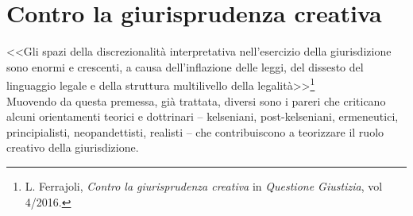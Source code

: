 \section{Contro la giurisprudenza creativa}%
<<Gli spazi della discrezionalità interpretativa nell’esercizio della giurisdizione sono enormi e crescenti, a causa dell’inflazione delle leggi, del dissesto del linguaggio legale e della struttura multilivello della legalità>>\footnote{L. Ferrajoli, \textit{Contro la giurisprudenza creativa} in \textit{Questione Giustizia}, vol 4/2016.}
\\Muovendo da questa premessa, già trattata, diversi sono i pareri che criticano alcuni orientamenti teorici e dottrinari – kelseniani, post-kelseniani, ermeneutici, principialisti, neopandettisti, realisti – che contribuiscono a teorizzare il ruolo creativo della giurisdizione. 

